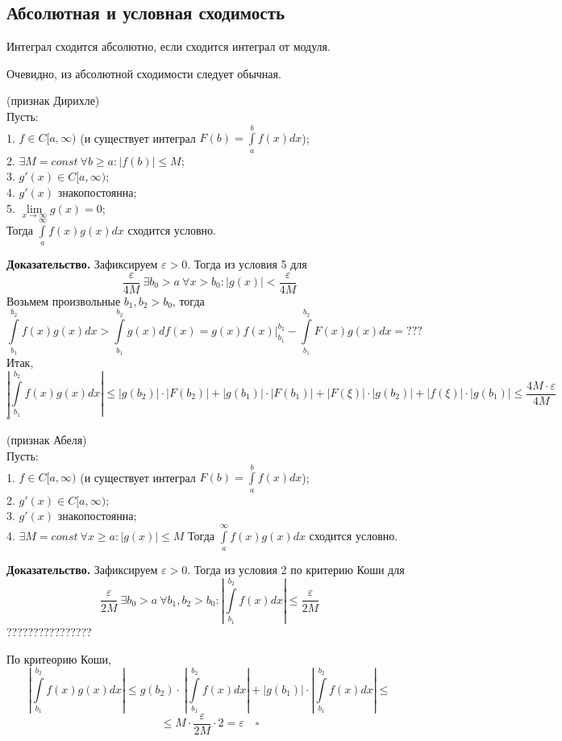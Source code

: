 \subsection{Абсолютная и условная сходимость}
\begin{defin}
Интеграл сходится абсолютно, если сходится интеграл от модуля.
\end{defin}
Очевидно, из абсолютной сходимости следует обычная. 
\begin{theor}
    (признак Дирихле)\\
    Пусть:\\
    1. $f\in C[a,\infty)$ 
    (и существует интеграл $F(b)=\int\limits_{a}^{b}f(x)dx$);\\
    2. $\exists M=const~\forall b\geqslant a:|f(b)|\leqslant M$;\\
    3. $g'(x)\in C[a,\infty)$;\\
    4. $g'(x)$ знакопостоянна;\\
    5. $\lim\limits_{x \to \infty}g(x)=0$;\\
    Тогда $\int\limits_{a}^{\infty}f(x)g(x)dx$ сходится условно. 
\end{theor}
\textbf{Доказательство.} Зафиксируем $\varepsilon>0$. Тогда из условия 5 для
$$\frac{\varepsilon}{4M}~\exists b_0>a~\forall x>b_0:|g(x)|<
\frac{\varepsilon}{4M}$$
Возьмем произвольные $b_1,b_2>b_0$, тогда 
$$\int\limits_{b_1}^{b_2}f(x)g(x)dx>\int\limits_{b_1}^{b_2}g(x)df(x)=
g(x)f(x)\Big|^{b_2}_{b_1}-\int\limits_{b_1}^{b_2}F(x)g(x)dx=???$$
Итак, 
$$ \left| \int\limits_{b_1}^{b_2} f(x)g(x)dx \right|\leqslant 
|g(b_2)|\cdot |F(b_2)|+|g(b_1)|\cdot |F(b_1)|+|F(\xi)|\cdot |g(b_2)|+
|f(\xi)|\cdot |g(b_1)|\leqslant\frac{4M\cdot \varepsilon}{4M}$$ 
$\square$ 

\begin{theor}
    (признак Абеля)\\
    Пусть:\\
    1. $f\in C[a,\infty)$ 
    (и существует интеграл $F(b)=\int\limits_{a}^{b}f(x)dx$);\\
    2. $g'(x)\in C[a,\infty)$;\\
    3. $g'(x)$ знакопостоянна;\\
    4. $\exists M=const~\forall x\geqslant a:|g(x)|\leqslant M$
    Тогда $\int\limits_{a}^{\infty}f(x)g(x)dx$ сходится условно. 
\end{theor}
\textbf{Доказательство.} Зафиксируем $\varepsilon>0$. Тогда из условия 2 по 
критерию Коши для
$$\frac{\varepsilon}{2M}~\exists b_0>a~\forall b_1,b_2>b_0:\left| 
\int\limits_{b_1}^{b_2}f(x)dx\right| \leqslant \frac{\varepsilon}{2M}$$
????????????????

По критеорию Коши,
$$\left|\int\limits_{b_1}^{b_2}f(x)g(x)dx \right|\leqslant g(b_2)\cdot \
\left| \int\limits_{b_1}^{b_2}f(x)dx\right|+|g(b_1)|\cdot 
\left| \int\limits_{b_1}^{b_2} f(x)dx\right|\leqslant 
$$
$$\leqslant M\cdot \frac{\varepsilon}{2M}\cdot 2=\varepsilon\quad\square $$



